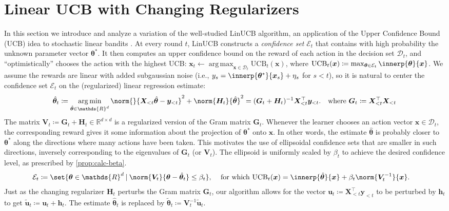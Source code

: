\documentclass{article}
\renewcommand{\vec}[1]{\bm{#1}}
\newcommand{\defeq}{\coloneq}
\newcommand{\inv}[1]{#1^{-1}}
\newcommand{\Real}{\mathds{R}}
\newcommand{\UCB}{\mathrm{UCB}}
\newcommand{\argmin}{\operatorname*{arg\,min}}
\newcommand{\argmax}{\operatorname*{arg\,max}}
\newcommand\given[1][\delimsize]{%
  \providecommand{\delimsize}{}
  \nonscript\:#1\vert\allowbreak\nonscript\:\mathopen{}
}
\newcommand{\D}{\mathcal{D}}
\newcommand{\E}{\mathcal{E}}
\providecommand\transp{\top}
\let\transpsymbol\transp
\renewcommand{\transp}[1]{#1^\transpsymbol}
\newcommand{\XtX}[1]{\transp{#1}{#1}}
\begin{document}
\section{Linear UCB with Changing Regularizers}
\label{sec:LinUCB}

In this section we introduce and analyze a variation of
the well-studied LinUCB algorithm, an application of the Upper
Confidence Bound (UCB) idea to stochastic linear bandits
\citep{DaniStochasticLinearOptimization2008,RusmevichientongLinearlyParameterizedBandits2010,AbbasiYadkoriImprovedAlgorithmsLinear2011}.
At every round $t$, LinUCB constructs a \emph{confidence set} $\E_t$
that contains  with high probability the unknown parameter vector $\vec\theta^*$.  It then computes an upper confidence bound on the reward
of each action in the decision set $\D_t$, and ``optimistically''
chooses the action with the highest UCB:
$\vec x_t \gets \argmax_{\vec x\in\D_t} \UCB_t(\vec x)$, where
$\UCB_t(\vec x) \defeq \max_{\vec\theta\in\E_t}
\innerp{\vec\theta}{\vec x}$.  We assume the rewards are linear with
added subgaussian noise (i.e.,
$y_s = \innerp{\vec\theta^*}{\vec x_s} + \eta_s$ for $s<t$), so it is
natural to center the confidence set $\E_t$ on the (regularized)
linear regression estimate:
\begin{align*}
  \hat{\vec\theta}_t
  &\defeq \argmin_{\hat{\vec\theta} \in \Real^d} \norm{}{\vec X_{<t} \hat{\vec\theta}
    - \vec y_{<t}}^2 + \norm{\vec H_t}{\hat{\vec\theta}}^2
    = \inv{(\vec G_t + \vec H_t)} \transp{\vec X_{<t}} \vec y_{<t}.
    &\text{where } \vec G_t \defeq \XtX{\vec X_{<t}}
\end{align*}
The matrix $\vec V_t \defeq \vec G_t + \vec H_t \in \Real^{d\times d}$ is a regularized
version of the Gram matrix $\vec G_t$.  Whenever the learner chooses an
action vector $\vec x\in \D_t$, the corresponding reward gives it some information
about the projection of $\vec\theta^*$ onto $\vec x$.  In other
words, the estimate $\hat{\vec\theta}$ is probably closer to
$\vec\theta^*$ along the directions where many actions have
been taken.  This motivates the use of ellipsoidal confidence sets
that are smaller in such directions, inversely
corresponding to the eigenvalues of $\vec G_t$ (or $\vec V_t$). The ellipsoid
is uniformly scaled by $\beta_t$ to achieve the desired confidence
level, as prescribed by \cref{prop:calc-beta}.
\begin{align}\label{eq:def-ellip}
  \E_t &\defeq \set{\vec\theta\in\Real^d \given
        \norm{\vec V_t}{\vec\theta-\hat{\vec\theta}_t} \le \beta_t},
  &\text{ for which }
    \UCB_t(\vec x) &= \innerp{\hat{\vec\theta}}{\vec x} + \beta_t\norm{\inv{\vec V_t}}{\vec x}.
\end{align}
Just as the changing regularizer $\vec H_t$ perturbs the Gram matrix $\vec G_t$,
our algorithm allows for the vector
$\vec u_t \defeq \transp{\vec X_{<t}} \vec y_{<t}$ to be perturbed
by $\vec h_t$ to get
$\tilde{\vec u}_t \defeq \vec u_t + \vec h_t$.  The estimate
$\hat{\vec\theta}_t$ is replaced by
$\tilde{\vec\theta}_t \defeq \inv{\vec V_t}\tilde{\vec u}_t$.
\end{document}
